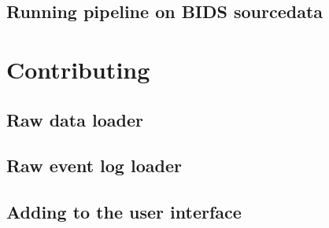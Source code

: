 \documentclass{article}
\begin{document}
\subsection{Running pipeline on BIDS sourcedata}

\section{Contributing}
\subsection{Raw data loader}
\subsection{Raw event log loader}
\subsection{Adding to the user interface}
\end{document}
